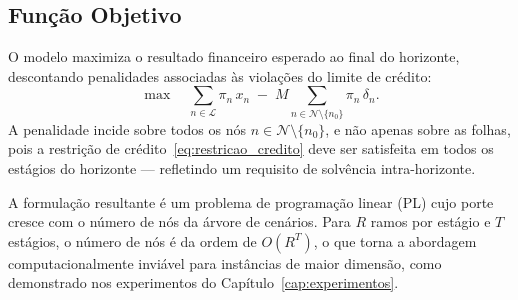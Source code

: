 \subsection{Fun\c{c}\~ao Objetivo}
\label{subsec:objetivo_deq}

O modelo maximiza o resultado financeiro esperado ao final do horizonte, descontando penalidades associadas \`as viola\c{c}\~oes do limite de cr\'edito:
%
\begin{equation}
  \max \quad \sum_{n \in \mathcal{L}} \pi_n\, x_n
  \;-\; M \sum_{n \in \mathcal{N} \setminus \{n_0\}} \pi_n\, \delta_n.
  \label{eq:objetivo_deq}
\end{equation}
%
A penalidade incide sobre todos os n\'os $n \in \mathcal{N} \setminus \{n_0\}$, e n\~ao apenas sobre as folhas, pois a restri\c{c}\~ao de cr\'edito~\eqref{eq:restricao_credito} deve ser satisfeita em todos os est\'agios do horizonte --- refletindo um requisito de solv\^encia intra-horizonte.

A formula\c{c}\~ao resultante \'e um problema de programa\c{c}\~ao linear (PL) cujo porte cresce com o n\'umero de n\'os da \'arvore de cen\'arios. Para $R$ ramos por est\'agio e $T$ est\'agios, o n\'umero de n\'os \'e da ordem de $O(R^T)$, o que torna a abordagem computacionalmente invi\'avel para inst\^ancias de maior dimens\~ao, como demonstrado nos experimentos do Cap\'itulo~\ref{cap:experimentos}.
